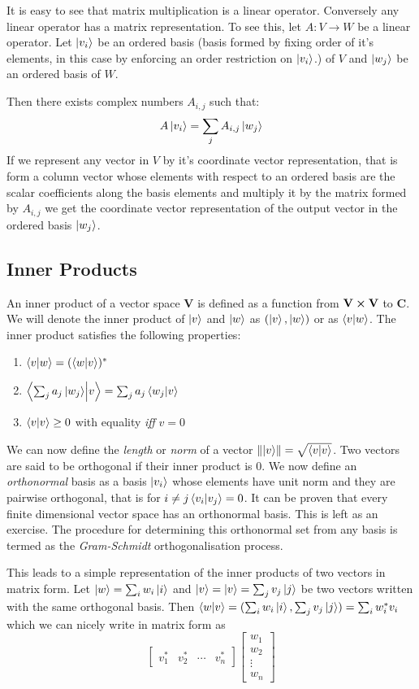 It is easy to see that matrix multiplication is a linear operator. Conversely any linear operator has a matrix representation. To see this, let $A: V \to W$ be a linear operator. Let $\ket{v_{i}}$ be an ordered basis (basis formed by fixing order of it's elements, in this case by enforcing an order restriction on $\ket{v_{i}}$.) of $V$ and $\ket{w_{j}}$ be an ordered basis of $W$.

Then there exists complex numbers $A_{i,j}$ such that: $$A\ket{v_{i}} = \sum_{j} A_{i,j}\ket{w_{j}}$$
If we represent any vector in $V$ by it's coordinate vector representation, that is form a column vector whose elements with respect to an ordered basis are the scalar coefficients along the basis elements  and multiply it by the matrix formed by $A_{i,j}$ we get the coordinate vector representation of the output vector in the ordered basis $\ket{w_{j}}$.

\subsection{Inner Products}
An inner product of a vector space \textbf{V} is defined as a function from $\textbf{V} \cross \textbf{V}$ to $\textbf{C}$. We will denote the inner product of $\ket{v}$ and $\ket{w}$ as $(\ket{v}, \ket{w})$ or as $\braket{v}{w}$. The inner product satisfies the following properties:
\begin{enumerate}
    \item $\braket{v}{w} = ({\braket{w}{v}})^{*}$
    \item $\braket{\sum_{j} a_{j} \ket{w_{j}}}{v} = \sum_{j} a_{j} \braket{w_{j}}{v}$
    \item $\braket{v}{v} \geq 0 $ with equality \textit{iff} $v=0$
\end{enumerate}
We can now define the \textit{length} or \textit{norm} of a vector 
$\norm{\ket{v}} = \sqrt{\braket{v}{v}}$. 
Two vectors are said to be orthogonal if their inner product is $0$. 
We now define an \textit{orthonormal} basis as a basis $\ket{v_{i}}$ whose elements have unit norm and they are pairwise orthogonal, that is for $i\neq j \braket{v_i}{v_j} = 0$.
It can be proven that every finite dimensional vector space has an orthonormal basis. This is left as an exercise. The procedure for determining this orthonormal set from any basis is termed as the \textit{Gram-Schmidt} orthogonalisation process.


This leads to a simple representation of the inner products of two vectors in matrix form. Let $\ket{w} = \sum_i w_i \ket{i}$ and $\ket{v} = \ket{v} = \sum_j v_j \ket{j} $ be two vectors written with the same orthogonal basis.
Then $\braket{w}{v} = (\sum_i w_i \ket{i}, \sum_j v_j \ket{j}) = \sum_i w_{i}^*v_i  $ which we can nicely write in matrix form as
$$ \begin{bmatrix} v_1^* & v_2^* & \cdots & v_n^* \end{bmatrix} \begin{bmatrix} w_1 \\ w_2 \\ \vdots \\ w_n \end{bmatrix}$$

